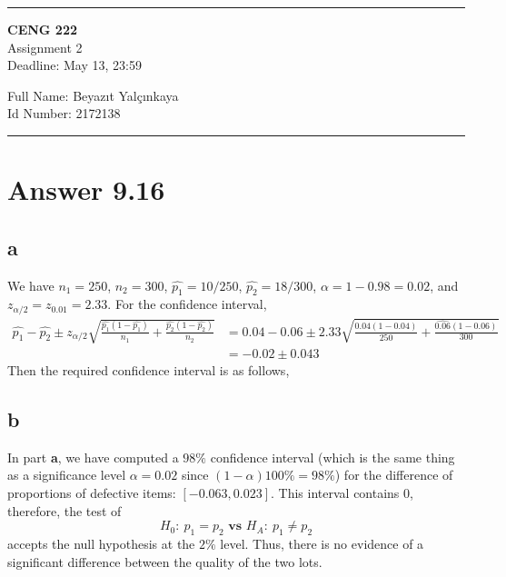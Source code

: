 \documentclass[11pt]{article}
\newcommand{\HRule}{\rule{\linewidth}{1mm}}
\begin{document}
\noindent
\HRule
\begin{center}
\Large 
\textbf{CENG 222}  \\
\normalsize 
Assignment 2 \\
Deadline: May 13, 23:59 \\
\end{center}
\begin{flushleft}
\normalsize 
	Full Name: Beyazıt Yalçınkaya \\
	Id Number: 2172138 
\end{flushleft}
\HRule

\section*{Answer 9.16}
\subsection*{a}
We have $n_1 = 250$, $n_2 = 300$, $\hat{p_1} = 10/250$, $\hat{p_2} = 18/300$, $\alpha = 1 - 0.98 = 0.02$, and $z_{\alpha/2} = z_{0.01} = 2.33$. For the  confidence interval,
\begin{equation}
\begin{split}
	\hat{p_1} - \hat{p_2} \pm z_{\alpha/2}\sqrt{\frac{\hat{p_1}(1 - \hat{p_1})}{n_1} + \frac{\hat{p_2}(1 - \hat{p_2})}{n_2}} & = 0.04 - 0.06 \pm 2.33 \sqrt{\frac{0.04(1 - 0.04)}{250} + \frac{\hat{0.06}(1 - 0.06)}{300}}\\
	& = -0.02 \pm 0.043
\end{split}
\end{equation}
Then the required confidence interval is as follows,
\begin{equation}
	[-0.063, 0.023]
\end{equation}
\subsection*{b}
In part \textbf{a}, we have computed a $98\%$ confidence interval (which is the same thing as a significance level $\alpha = 0.02$ since $(1 - \alpha)100\% = 98\%$) for the difference of proportions of defective items: $[-0.063, 0.023]$. This interval contains $0$, therefore, the test of
\begin{equation*}
	H_0: \ p_1 = p_2 \textbf{ vs } H_A: \ p_1 \neq p_2
\end{equation*}
accepts the null hypothesis at the $2\%$ level. Thus, there is no evidence of a significant difference between the quality of the two lots.
\end{document}
